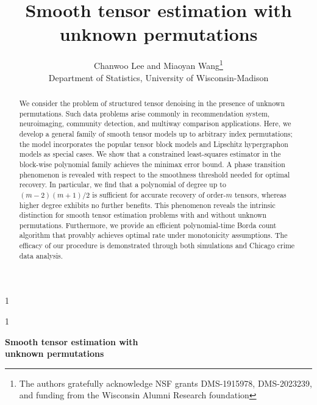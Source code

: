 \documentclass[12pt]{article}
\newcommand{\blind}{1}
\theoremstyle{definition}
\begin{document}
\def\spacingset#1{\renewcommand{\baselinestretch}%
{#1}\small\normalsize} \spacingset{1}



\blind
{
  \title{\bf Smooth tensor estimation with \\ unknown permutations}
  \author{Chanwoo Lee and Miaoyan Wang\thanks{
    The authors gratefully acknowledge NSF grants DMS-1915978, DMS-2023239, and funding from the Wisconsin Alumni Research foundation}\hspace{.2cm}\\
    Department of Statistics, University of Wisconsin-Madison}
  \maketitle
} \fi

\blind
{
  \bigskip
  \bigskip
  \bigskip
  \begin{center}
    {\LARGE\bf Smooth tensor estimation with \\unknown permutations}
\end{center}
  \medskip
} \fi

\bigskip

\begin{abstract}%
 We consider the problem of structured tensor denoising in the presence of unknown permutations. Such data problems arise commonly in recommendation system, neuroimaging, community detection, and multiway comparison applications. Here, we develop a general family of smooth tensor models up to arbitrary index permutations; the model incorporates the popular tensor block models and Lipschitz hypergraphon models as special cases. We show that a constrained least-squares estimator in the block-wise polynomial family achieves the minimax error bound. A phase transition phenomenon is revealed with respect to the smoothness threshold needed for optimal recovery. In particular, we find that a polynomial of degree up to {\footnotesize $(m-2)(m+1)/2$} is sufficient for accurate recovery of order-$m$ tensors, whereas higher degree exhibits no further benefits. This phenomenon reveals the intrinsic distinction for smooth tensor estimation problems with and without unknown permutations. Furthermore, we provide an efficient polynomial-time Borda count algorithm that provably achieves optimal rate under monotonicity assumptions. The efficacy of our procedure is demonstrated through both simulations and Chicago crime data analysis. 
  \end{abstract}
\end{document}
